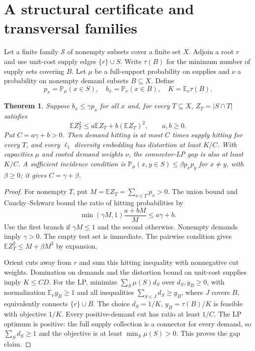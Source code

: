 \documentclass[11pt]{article}
\newtheorem{theorem}{Theorem}
\newcommand{\E}{\mathbb E}
\newcommand{\Prob}{\mathbb P}
\begin{document}
\section{A structural certificate and transversal families}
Let a finite family $\mathcal S$ of nonempty subsets cover a finite set $X$.
Adjoin a root $r$ and use unit-cost supply edges $\{r\}\cup S$.
Write $\tau(B)$ for the minimum number of supply sets covering $B$.
Let $\mu$ be a full-support probability on supplies and $\nu$ a probability
on nonempty demand subsets $B\subseteq X$. Define
\[
 p_x=\Prob_\mu(x\in S),\quad b_x=\Prob_\nu(x\in B),
 \quad K=\E_\nu\tau(B).
\]
\begin{theorem}\label{thm:moment}
Suppose $b_x\le\gamma p_x$ for all $x$ and, for every $T\subseteq X$,
$Z_T=|S\cap T|$ satisfies
\[
 \E Z_T^2\le a\E Z_T+b(\E Z_T)^2,\qquad a,b\ge0.
\]
Put $C=a\gamma+b>0$. Then demand hitting is at most $C$ times supply
hitting for every $T$, and every $\ell_1$ diversity embedding has distortion
at least $K/C$. With capacities $\mu$ and rooted demand weights $\nu$,
the connector-LP gap is also at least $K/C$.
A sufficient incidence condition is
$\Prob_\mu(x,y\in S)\le\beta p_xp_y$ for $x\ne y$, with $\beta\ge0$;
it gives $C=\gamma+\beta$.
\end{theorem}
\begin{proof}
For nonempty $T$, put $M=\E Z_T=\sum_{x\in T}p_x>0$.
The union bound and Cauchy--Schwarz bound the ratio of hitting probabilities by
\[
 \min(\gamma M,1)\frac{a+bM}{M}\le a\gamma+b.
\]
Use the first branch if $\gamma M\le1$ and the second otherwise.
Nonempty demands imply $\gamma>0$. The empty test set is immediate.
The pairwise condition gives $\E Z_T^2\le M+\beta M^2$ by expansion.

Orient cuts away from $r$ and sum this hitting inequality with nonnegative
cut weights. Domination on demands and the distortion bound on unit-cost
supplies imply $K\le CD$.
For the LP, minimize $\sum_S\mu(S)d_S$ over $d_S,y_B\ge0$, with normalization
$\E_\nu y_B\ge1$ and all inequalities $\sum_{S\in J}d_S\ge y_B$,
where $J$ covers $B$, equivalently connects $\{r\}\cup B$.
The choice $d_S=1/K$, $y_B=\tau(B)/K$ is feasible with objective $1/K$.
Every positive-demand cut has ratio at least $1/C$.
The LP optimum is positive: the full supply collection is a connector
for every demand, so $\sum_Sd_S\ge1$ and the objective is at least
$\min_S\mu(S)>0$. This proves the gap claim.
\end{proof}
\end{document}
